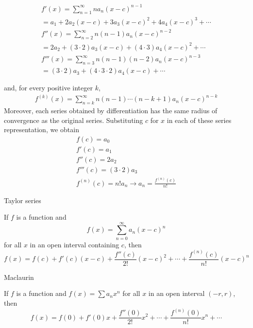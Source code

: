 \documentclass[newPxFont]{beamer}
\begin{document}
\begin{frame}
  \begin{eqnarray}
    f'(x)=\sum_{n=1}^\infty na_n(x-c)^{n-1}\\\nonumber
    =a_1+2a_2(x-c)+3a_3(x-c)^2+4a_4(x-c)^3+\cdots\\
    f''(x)=\sum_{n=2}^\infty n(n-1)a_n(x-c)^{n-2}\\\nonumber
    =2a_2+(3\cdot2)a_3(x-c)+(4\cdot3)a_4(x-c)^2+\cdots\\
    f'''(x)=\sum_{n=3}^\infty n(n-1)(n-2)a_n(x-c)^{n-3}\\\nonumber
    =(3\cdot2)a_3+(4\cdot3\cdot2)a_4(x-c)+\cdots
  \end{eqnarray}
\end{frame}

\begin{frame}
  and, for every positive integer $k$,
  \begin{eqnarray}
    f^{(k)}(x)=\sum_{n=k}^{\infty} n(n-1)\cdots(n-k+1)a_n(x-c)^{n-k}
  \end{eqnarray}
  Moreover, each series obtained by differentiation has the same radius of convergence as the original series. Substituting $c$ for $x$ in each of these series representation, we obtain
  \begin{eqnarray}
    f(c)=a_0\\
    f'(c)=a_1\\
    f''(c)=2a_2\\
    f'''(c)=(3\cdot2)a_3\\
    f^{(n)}(c)=n!a_n \to a_n=\frac{f^{(n)}(c)}{n!}
  \end{eqnarray}
\end{frame}

\begin{frame}{Taylor series}
\begin{theorem}
  If $f$ is a function and
  \begin{equation}
    f(x)=\sum_{n=0}^\infty a_n(x-c)^n
  \end{equation}
  for all $x$ in an open interval containing $c$, then
  \begin{equation}
    f(x)=f(c)+f'(c)(x-c)+\frac{f''(c)}{2!}(x-c)^2+\cdots+\frac{f^{(n)}(c)}{n!}(x-c)^n
  \end{equation}
\end{theorem}
\end{frame}

\begin{frame}{Maclaurin}
  \begin{Corollary}
    If $f$ is a function and $f(x)=\sum a_nx^n$ for all $x$ in an open interval $(-r,r)$, then
    \begin{equation}
    f(x)=f(0)+f'(0)x+\frac{f''(0)}{2!}x^2+\cdots+\frac{f^{(n)}(0)}{n!}x^n+\cdots
    \end{equation}
  \end{Corollary}
\end{frame}
\end{document}

